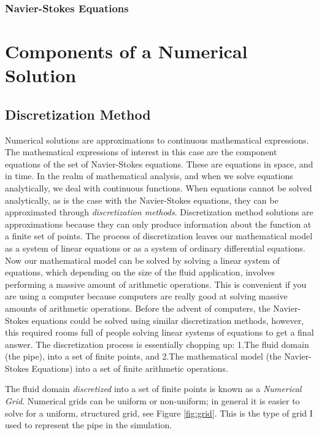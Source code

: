 \documentclass[twocolumn,12pth]{article}
\begin{document}
\subsubsection{Navier-Stokes Equations}

\section{Components of a Numerical Solution}

\subsection{Discretization Method}

Numerical solutions are approximations to continuous mathematical expressions.
The mathematical expressions of interest in this case are the component equations of the set of Navier-Stokes equations.
These are equations in space, and in time. 
In the realm of mathematical analysis, and when we solve equations analytically, we deal with continuous functions.
When equations cannot be solved analytically, as is the case with the Navier-Stokes equations, they can be approximated through \textit{discretization methods}.
Discretization method solutions are approximations because they can only produce information about the function at a finite set of points.
The process of discretization leaves our mathematical model as a system of linear equations or as a system of ordinary differential equations.
Now our mathematical model can be solved by solving a linear system of equations, which depending on the size of the fluid application, involves performing a massive amount of arithmetic operations.
This is convenient if you are using a computer because computers are really good at solving massive amounts of arithmetic operations.
Before the advent of computers, the Navier-Stokes equations could be solved using similar discretization methods, however, this required rooms full of people solving linear systems of equations to get a final answer.
The discretization process is essentially chopping up: 1.The fluid domain (the pipe), into a set of finite points, and 2.The mathematical model (the Navier-Stokes Equations) into a set of finite arithmetic operations.

The fluid domain \textit{discretized} into a set of finite points is known as a \textit{Numerical Grid}.
Numerical grids can be uniform or non-uniform; in general it is easier to solve for a uniform, structured grid, see Figure \ref{fig:grid}.
This is the type of grid I used to represent the pipe in the simulation.
\end{document}
